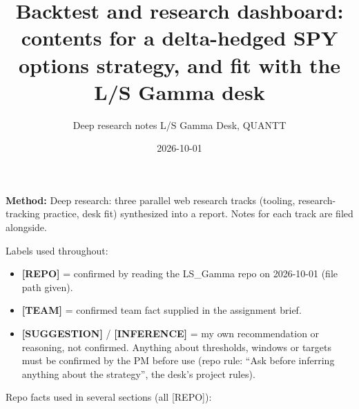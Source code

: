 \documentclass{article}
\title{Backtest and research dashboard: contents for a delta-hedged SPY options strategy, and fit with the L/\allowbreak{}S Gamma desk}
\author{Deep research notes \textperiodcentered{} L/S Gamma Desk, QUANTT}
\date{2026-10-01}
\begin{document}
\maketitle

\textbf{Method:} Deep research: three parallel web research tracks (tooling, research-tracking practice, desk fit) synthesized into a report. Notes for each track are filed alongside.

Labels used throughout:

\begin{itemize}

\item \textbf{[REPO]} = confirmed by reading the LS\_Gamma repo on 2026-10-01 (file path given).

\item \textbf{[TEAM]} = confirmed team fact supplied in the assignment brief.

\item \textbf{[SUGGESTION]} /\allowbreak{} \textbf{[INFERENCE]} = my own recommendation or reasoning, not confirmed. Anything about thresholds, windows or targets must be confirmed by the PM before use (repo rule: ``Ask before inferring anything about the strategy'', the desk's project rules).

\end{itemize}

Repo facts used in several sections (all [REPO]):
\end{document}
